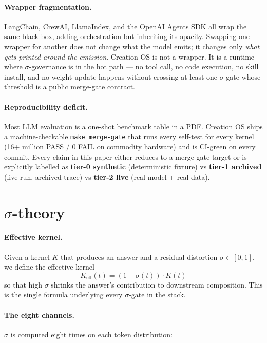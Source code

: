 \documentclass[11pt,letterpaper]{article}
\newcommand{\code}[1]{\texttt{#1}}
\begin{document}
\paragraph{Wrapper fragmentation.} LangChain, CrewAI, LlamaIndex,
and the OpenAI Agents SDK all wrap the same black box, adding
orchestration but inheriting its opacity. Swapping one wrapper for
another does not change what the model emits; it changes only
\emph{what gets printed around the emission}. Creation OS is not a
wrapper. It is a runtime where $\sigma$-governance is in the hot
path --- no tool call, no code execution, no skill install, and no
weight update happens without crossing at least one $\sigma$-gate
whose threshold is a public merge-gate contract.

\paragraph{Reproducibility deficit.} Most LLM evaluation is a
one-shot benchmark table in a PDF. Creation OS ships a
machine-checkable \code{make merge-gate} that runs every
self-test for every kernel (16+ million PASS / 0 FAIL on commodity
hardware) and is CI-green on every commit. Every claim in this
paper either reduces to a merge-gate target or is explicitly
labelled as \textbf{tier-0 synthetic} (deterministic fixture) vs
\textbf{tier-1 archived} (live run, archived trace) vs
\textbf{tier-2 live} (real model + real data).

\section{$\sigma$-theory}

\paragraph{Effective kernel.} Given a kernel $K$ that produces an
answer and a residual distortion $\sigma \in [0, 1]$, we define the
effective kernel
\begin{equation}
  K_{\mathrm{eff}}(t) = (1 - \sigma(t)) \cdot K(t)
\end{equation}
so that high $\sigma$ shrinks the answer's contribution to
downstream composition. This is the single formula underlying
every $\sigma$-gate in the stack.

\paragraph{The eight channels.} $\sigma$ is computed eight times
on each token distribution:
\end{document}
